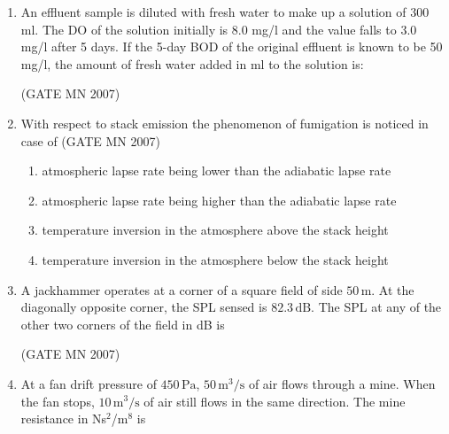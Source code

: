 \documentclass[journal]{IEEEtran}
\begin{document}
\begin{enumerate}
\item An effluent sample is diluted with fresh water to make up a solution of 300 ml. The DO of the solution initially is 8.0 mg/l and the value falls to 3.0 mg/l after 5 days. If the 5-day BOD of the original effluent is known to be 50 mg/l, the amount of fresh water added in ml to the solution is:



	\hfill (GATE MN 2007)
\begin{enumerate}
\end{enumerate}



\item With respect to stack emission the phenomenon of fumigation is noticed in case of 
	\hfill (GATE MN 2007)
\begin{enumerate}
    \item atmospheric lapse rate being lower than the adiabatic lapse rate
    \item atmospheric lapse rate being higher than the adiabatic lapse rate
    \item temperature inversion in the atmosphere above the stack height
    \item temperature inversion in the atmosphere below the stack height
\end{enumerate}


\item A jackhammer operates at a corner of a square field of side $50\,\text{m}$.  
At the diagonally opposite corner, the SPL sensed is $82.3\,\text{dB}$.  
The SPL at any of the other two corners of the field in dB is  


\hfill (GATE MN 2007)
\begin{enumerate}
\end{enumerate}



\item At a fan drift pressure of $450\,\text{Pa}$, $50\,\text{m}^3/\text{s}$ of air flows through a mine.  
When the fan stops, $10\,\text{m}^3/\text{s}$ of air still flows in the same direction.  
The mine resistance in Ns$^2$/m$^8$ is



\end{enumerate}
\end{document}
